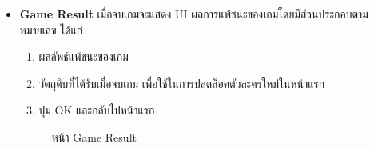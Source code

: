 \documentclass[12pt,oneside,openright,a4paper]{cpe-thai-project}
\begin{document}
\begin{itemize}
  \pagebreak
  \item \textbf{Game Result}
  เมื่อจบเกมจะแสดง UI ผลการแพ้ชนะของเกมโดยมีส่วนประกอบตามหมายเลข ได้แก่
  \begin{enumerate}
    \item ผลลัพธ์แพ้ชนะของเกม
    \item วัตถุดิบที่ได้รับเมื่อจบเกม เพื่อใช้ในการปลดล็อคตัวละครใหม่ในหน้าแรก
    \item ปุ่ม OK และกลับไปหน้าแรก
  \end{enumerate}
  
  \begin{figure}[H]\centering
    \setlength{\fboxsep}{0cm}
    \caption{หน้า Game Result}\label{fig:3-17}
  \end{figure}
\end{itemize}
\end{document}
